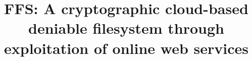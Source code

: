 \title{FFS: A cryptographic \mbox{cloud-based} deniable filesystem through exploitation of online web services}